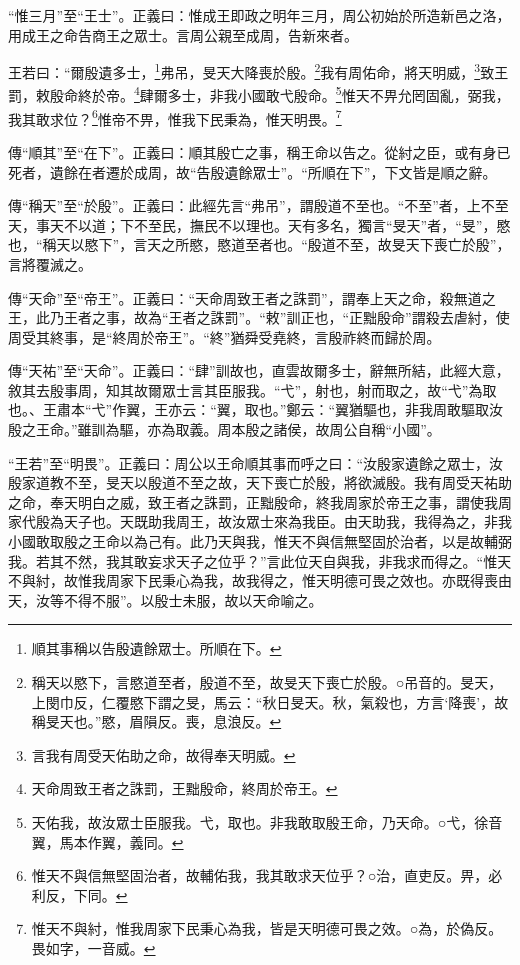 {\noindent\shu{}\fzkt “惟三月”至“王士”。正義曰：惟成王即政之明年三月，周公初始於所造新邑之洛，用成王之命告商王之眾士。言周公親至成周，告新來者。 \par}

王若曰：“爾殷遺多士，\footnote{順其事稱以告殷遺餘眾士。所順在下。}弗吊，旻天大降喪於殷。\footnote{稱天以愍下，言愍道至者，殷道不至，故旻天下喪亡於殷。○吊音的。旻天，上閔巾反，仁覆愍下謂之旻，馬云：“秋日旻天。秋，氣殺也，方言‘降喪’，故稱旻天也。”愍，眉隕反。喪，息浪反。}我有周佑命，將天明威，\footnote{言我有周受天佑助之命，故得奉天明威。}致王罰，敕殷命終於帝。\footnote{天命周致王者之誅罰，王黜殷命，終周於帝王。}肆爾多士，非我小國敢弋殷命。\footnote{天佑我，故汝眾士臣服我。弋，取也。非我敢取殷王命，乃天命。○弋，徐音翼，馬本作翼，義同。}惟天不畀允罔固亂，弼我，我其敢求位？\footnote{惟天不與信無堅固治者，故輔佑我，我其敢求天位乎？○治，直吏反。畀，必利反，下同。}惟帝不畀，惟我下民秉為，惟天明畏。\footnote{惟天不與紂，惟我周家下民秉心為我，皆是天明德可畏之效。○為，於偽反。畏如字，一音威。}

{\noindent\zhuan{}\fzbyks 傳“順其”至“在下”。正義曰：順其殷亡之事，稱王命以告之。從紂之臣，或有身已死者，遺餘在者遷於成周，故“告殷遺餘眾士”。“所順在下”，下文皆是順之辭。 \par}

{\noindent\zhuan{}\fzbyks 傳“稱天”至“於殷”。正義曰：此經先言“弗吊”，謂殷道不至也。“不至”者，上不至天，事天不以道；下不至民，撫民不以理也。天有多名，獨言“旻天”者，“旻”，愍也，“稱天以愍下”，言天之所愍，愍道至者也。“殷道不至，故旻天下喪亡於殷”，言將覆滅之。 \par}

{\noindent\zhuan{}\fzbyks 傳“天命”至“帝王”。正義曰：“天命周致王者之誅罰”，謂奉上天之命，殺無道之王，此乃王者之事，故為“王者之誅罰”。“敕”訓正也，“正黜殷命”謂殺去虐紂，使周受其終事，是“終周於帝王”。“終”猶舜受堯終，言殷祚終而歸於周。 \par}

{\noindent\zhuan{}\fzbyks 傳“天祐”至“天命”。正義曰：“肆”訓故也，直雲故爾多士，辭無所結，此經大意，敘其去殷事周，知其故爾眾士言其臣服我。“弋”，射也，射而取之，故“弋”為取也。、王肅本“弋”作翼，王亦云：“翼，取也。”鄭云：“翼猶驅也，非我周敢驅取汝殷之王命。”雖訓為驅，亦為取義。周本殷之諸侯，故周公自稱“小國”。 \par}

{\noindent\shu{}\fzkt “王若”至“明畏”。正義曰：周公以王命順其事而呼之曰：“汝殷家遺餘之眾士，汝殷家道教不至，旻天以殷道不至之故，天下喪亡於殷，將欲滅殷。我有周受天祐助之命，奉天明白之威，致王者之誅罰，正黜殷命，終我周家於帝王之事，謂使我周家代殷為天子也。天既助我周王，故汝眾士來為我臣。由天助我，我得為之，非我小國敢取殷之王命以為己有。此乃天與我，惟天不與信無堅固於治者，以是故輔弼我。若其不然，我其敢妄求天子之位乎？”言此位天自與我，非我求而得之。“惟天不與紂，故惟我周家下民秉心為我，故我得之，惟天明德可畏之效也。亦既得喪由天，汝等不得不服”。以殷士未服，故以天命喻之。 \par}

